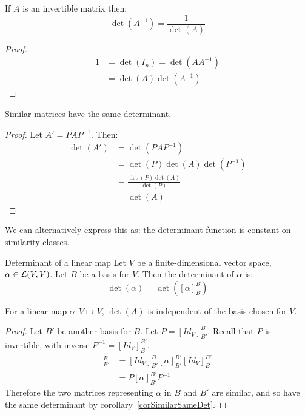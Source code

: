 \documentclass[../Main.tex]{subfiles}
\begin{document}
\begin{corollary}
    If $A$ is an invertible matrix then:
    \begin{equation*}
        \det(A^{-1}) = \frac{1}{\det(A)}
    \end{equation*}
    \label{corInvertDet}
\end{corollary}
\begin{proof}
    \begin{align*}
        1 &= \det(I_n) = \det(AA^{-1}) \\
        &= \det(A) \det(A^{-1})
    \end{align*}
\end{proof}
\begin{corollary}
    Similar matrices have the same determinant.
    \label{corSimilarSameDet}
\end{corollary}
\begin{proof}
    Let $A' = PAP^{-1}$. Then:
    \begin{align*}
        \det(A') &= \det(PAP^{-1}) \\
        &= \det(P) \det(A) \det(P^{-1}) \\
        &=\frac{\det(P) \det(A)}{\det(P)} \\
        &= \det(A)
    \end{align*}
\end{proof}
\begin{remark}
    We can alternatively express this as: the determinant function is constant on similarity classes.
\end{remark}
\begin{definition}{Determinant of a linear map}
    Let $V$ be a finite-dimensional vector space, $\alpha \in \mathcal{L}(V, V)$. Let $B$ be a basis for $V$. Then the \underline{determinant} of $\alpha$ is:
    \begin{equation*}
        \det(\alpha) = \det([\alpha]_B^B)
    \end{equation*}
\end{definition}
\begin{proposition}
    For a linear map $\alpha : V\mapsto V$, $\det(A)$ is independent of the basis chosen for $V$.
    \label{propDetLinMapUnique}
\end{proposition}
\begin{proof}
    Let $B'$ be another basis for $B$. Let $P = [Id_V]^B_{B'}$. Recall that $P$ is invertible, with inverse $P^{-1} = [Id_V]_B^{B'}$.
    \begin{align*}
        [\alpha]_{B'}^B &= [Id_V]_{B'}^B [\alpha]_{B'}^{B'} [Id_V]_{B}^{B'}\\ 
        &= P[\alpha]_{B'}^{B'} P^{-1}
    \end{align*}
    Therefore the two matrices representing $\alpha$ in $B$ and $B'$ are similar, and so have the same determinant by corollary~\ref{corSimilarSameDet}.
\end{proof}
\end{document}
